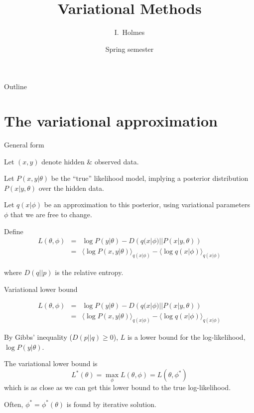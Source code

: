 \documentclass{beamer}
\title[Variational] %
{Variational Methods}
\author%
{I.~Holmes} %
\institute[University of California, Berkeley] %
{
  Department of Bioengineering\\
  University of California, Berkeley}
\date%
{Spring semester}
\begin{document}
\begin{frame}
  \titlepage
\end{frame}

\begin{frame}{Outline}
  \tableofcontents
\end{frame}

\section{The variational approximation}

\begin{frame}{General form}

Let $(x,y)$ denote hidden \& observed data.

Let $P(x,y|\theta)$ be the ``true'' likelihood model,
implying a posterior distribution $P(x|y,\theta)$ over the hidden data.

Let $q(x|\phi)$ be an approximation to this posterior,
using variational parameters $\phi$
that we are free to change.

Define
\begin{eqnarray*}
L(\theta,\phi) & = & \log P(y|\theta) - D\left(q(x|\phi)||P(x|y,\theta)\right) \\
& = & \langle \log P(x,y|\theta) \rangle_{q(x|\phi)} - \langle \log q(x|\phi) \rangle_{q(x|\phi)}
\end{eqnarray*}

where $D(q||p)$ is the relative entropy.

\end{frame}


\begin{frame}{Variational lower bound}

\begin{eqnarray*}
L(\theta,\phi) & = & \log P(y|\theta) - D\left(q(x|\phi)||P(x|y,\theta)\right) \\
& = & \langle \log P(x,y|\theta) \rangle_{q(x|\phi)} - \langle \log q(x|\phi) \rangle_{q(x|\phi)}
\end{eqnarray*}

By Gibbs' inequality ($D(p||q) \geq 0$), $L$ is a lower bound for the log-likelihood, $\log P(y|\theta)$.

The variational lower bound is
\[
L^\ast(\theta) = \max_{\phi} L(\theta,\phi) = L(\theta,\phi^\ast)
\]
which is as close as we can get this lower bound to the true log-likelihood.

Often, $\phi^\ast=\phi^\ast(\theta)$ is found by iterative solution.

\end{frame}
\end{document}
